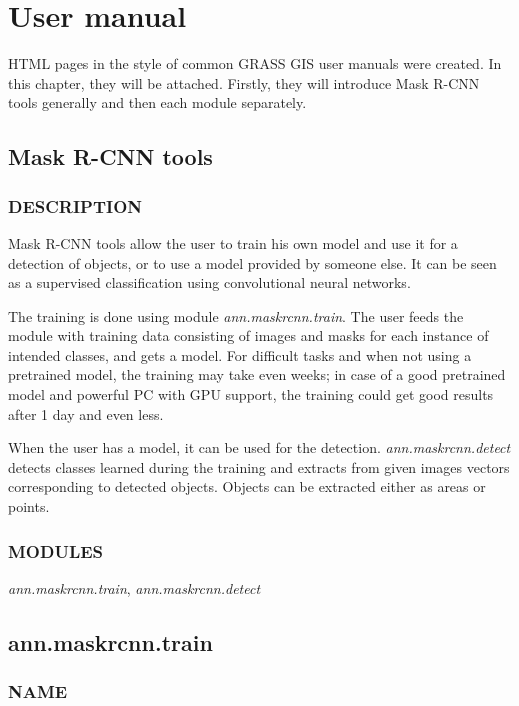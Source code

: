\chapter{User manual}
\label{manual}

HTML pages in the style of common GRASS GIS user manuals were created. In this
chapter, they will be attached. Firstly, they will introduce Mask R-CNN tools
generally and then each module separately.

\section{Mask R-CNN tools}

\subsection*{DESCRIPTION}
Mask R-CNN tools allow the user to train his own model and use it for a 
detection of objects, or to use a model provided by someone else. It can be seen 
as a supervised classification using convolutional neural networks.

The training is done using module \emph{ann.maskrcnn.train}. The user feeds the 
module with training data consisting of images and masks for each instance of 
intended classes, and gets a model. For difficult tasks and when not using a 
pretrained model, the training may take even weeks; in case of a good pretrained 
model and powerful PC with GPU support, the training could get good results 
after 1 day and even less.

When the user has a model, it can be used for the detection. 
\emph{ann.maskrcnn.detect} detects classes learned during the training and 
extracts from given images vectors corresponding to detected objects. Objects 
can be extracted either as areas or points. 

\subsection*{MODULES}
\emph{ann.maskrcnn.train},\emph{ }\emph{ann.maskrcnn.detect}\emph{ }

\clearpage

\section{ann.maskrcnn.train}

\subsection*{NAME}

